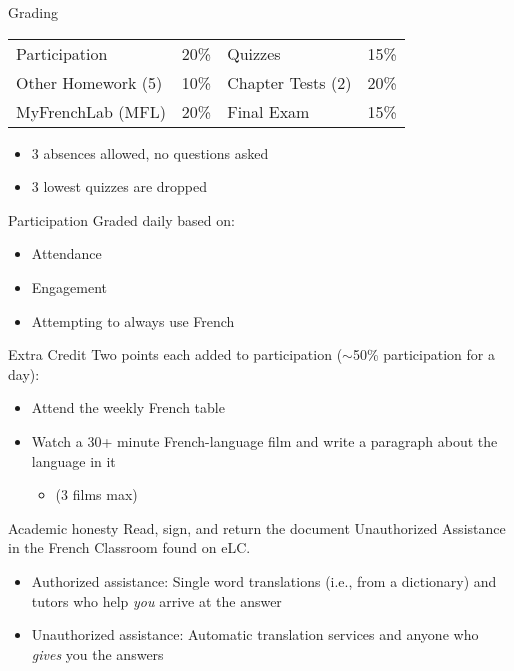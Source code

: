 \documentclass{beamer}
\begin{document}
  \begin{frame}{Grading}
    \begin{center}
      \begin{tabular}{l l | l l}
        Participation      & 20\% & Quizzes           & 15\% \\
        Other Homework (5) & 10\% & Chapter Tests (2) & 20\% \\
        MyFrenchLab (MFL)  & 20\% & Final Exam        & 15\% \\
      \end{tabular}
    \end{center}
    \begin{itemize}
      \item 3 absences allowed, no questions asked
      \item 3 lowest quizzes are dropped
    \end{itemize}
  \end{frame}

  \begin{frame}{Participation}
    Graded daily based on:
    \begin{itemize}
      \item Attendance
      \item Engagement
      \item Attempting to always use French
    \end{itemize}
  \end{frame}

  \begin{frame}{Extra Credit}
    Two points each added to participation ($\sim$50\% participation for a day):
    \begin{itemize}
      \item Attend the weekly French table
      \item Watch a 30+ minute French-language film and write a paragraph about the language in it
      \begin{itemize}
        \item (3 films max)
      \end{itemize}
    \end{itemize}
  \end{frame}

  \begin{frame}{Academic honesty}
    Read, sign, and return the document Unauthorized Assistance in the French Classroom found on eLC.
    \begin{itemize}
      \item Authorized assistance: Single word translations (i.e., from a dictionary) and tutors who help \emph{you} arrive at the answer
      \item Unauthorized assistance: Automatic translation services and anyone who \emph{gives} you the answers
    \end{itemize}
  \end{frame}
\end{document}
